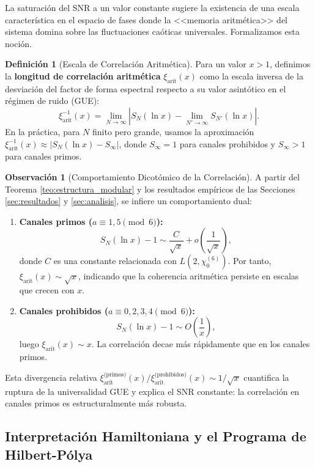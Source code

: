 \documentclass[12pt, a4paper]{article}
\theoremstyle{plain}
\theoremstyle{definition}
\newtheorem{definicion}[teorema]{Definición}
\newtheorem{observacion}[teorema]{Observación}
\theoremstyle{remark}
\begin{document}
La saturación del SNR a un valor constante sugiere la existencia de una escala característica en el espacio de fases donde la <<memoria aritmética>> del sistema domina sobre las fluctuaciones caóticas universales. Formalizamos esta noción.

\begin{definicion}[Escala de Correlación Aritmética]
Para un valor $x > 1$, definimos la \textbf{longitud de correlación aritmética} $\xi_{\text{arit}}(x)$ como la escala inversa de la desviación del factor de forma espectral respecto a su valor asintótico en el régimen de ruido (GUE):
\[
\xi_{\text{arit}}^{-1}(x) = \lim_{N \to \infty} \left| S_N(\ln x) - \lim_{N'\to\infty} S_{N'}(\ln x) \right|.
\]
En la práctica, para $N$ finito pero grande, usamos la aproximación $\xi_{\text{arit}}^{-1}(x) \approx |S_N(\ln x) - S_{\infty}|$, donde $S_{\infty} = 1$ para canales prohibidos y $S_{\infty} > 1$ para canales primos.
\end{definicion}

\begin{observacion}[Comportamiento Dicotómico de la Correlación]
A partir del Teorema \ref{teo:estructura_modular} y los resultados empíricos de las Secciones \ref{sec:resultados} y \ref{sec:analisis}, se infiere un comportamiento dual:
\begin{enumerate}
    \item \textbf{Canales primos ($a \equiv 1,5 \pmod{6}$):} 
    \[
    S_N(\ln x) - 1 \sim \frac{C}{\sqrt{x}} + o\left(\frac{1}{\sqrt{x}}\right),
    \]
    donde $C$ es una constante relacionada con $L(2, \chi_0^{(6)})$. Por tanto, $\xi_{\text{arit}}(x) \sim \sqrt{x}$, indicando que la coherencia aritmética persiste en escalas que crecen con $x$.
    
    \item \textbf{Canales prohibidos ($a \equiv 0,2,3,4 \pmod{6}$):}
    \[
    S_N(\ln x) - 1 \sim O\left(\frac{1}{x}\right),
    \]
    luego $\xi_{\text{arit}}(x) \sim x$. La correlación decae más rápidamente que en los canales primos.
\end{enumerate}
Esta divergencia relativa $\xi_{\text{arit}}^{\text{(primos)}}(x) / \xi_{\text{arit}}^{\text{(prohibidos)}}(x) \sim 1/\sqrt{x}$ cuantifica la ruptura de la universalidad GUE y explica el SNR constante: la correlación en canales primos es estructuralmente más robusta.
\end{observacion}

\subsection{Interpretación Hamiltoniana y el Programa de Hilbert-Pólya}
\label{ap:hilbert_polya}
\end{document}
